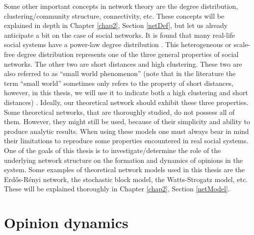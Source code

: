 \documentclass[11 pt , letterpaper , twoside , openright]{book}
\begin{document}
\newline
Some other important concepts in network theory are the degree distribution, clustering/community structure, connectivity, etc. These concepts will be explained in depth in Chapter \ref{chap2}, Section \ref{netDef}, but let us already anticipate a bit on the case of social networks. It is found that many real-life social systems have a power-law degree distribution \cite{Muchnik2013}. This heterogeneous or scale-free degree distribution represents one of the three general properties of social networks. The other two are short distances and high clustering. These two are also referred to as ``small world phenomenon'' (note that in the literature the term ``small world'' sometimes only refers to the property of short distances, however, in this thesis, we will use it to indicate both a high clustering and short distances) \cite{Muchnik2013}. Ideally, our theoretical network should exhibit these three properties. Some theoretical networks, that are thoroughly studied, do not possess all of them. However, they might still be used, because of their simplicity and ability to produce analytic results. When using these models one must always bear in mind their limitations to reproduce some properties encountered in real social systems. \\
\newline
One of the goals of this thesis is to investigate/determine the role of the underlying network structure on the formation and dynamics of opinions in the system. Some examples of theoretical network models used in this thesis are the Erd\H{o}s-R\'{e}nyi network, the stochastic block model, the Watts-Strogatz model, etc. These will be explained thoroughly in Chapter \ref{chap2}, Section \ref{netModel}. 



\section{Opinion dynamics}\label{Opinion}
\end{document}
